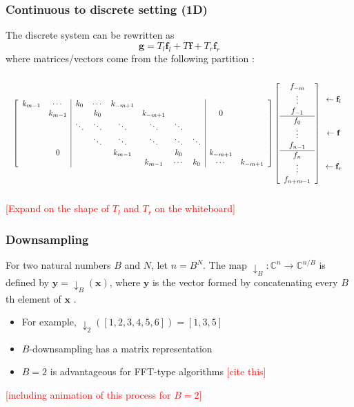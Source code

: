 \documentclass{beamer}
\newcommand{\ToDo}[1]{\textcolor{red}{[#1]}}
\newcommand{\gVec}{\mathbf{g}}	%
\newcommand{\fVec}{\mathbf{f}}	%
\begin{document}
\begin{frame}
\frametitle{Continuous to discrete setting (1D)}
The discrete system can be rewritten as
\[\gVec = T_{l}\fVec_{l} + T\fVec + T_{r}\fVec_{r}\]
where matrices/vectors come from the following partition \cite{NeumannDCT}:
\[\resizebox{1 \textwidth}{!}{$
\left[\begin{array}{cc|cccccc|cc}
k_{m-1} & \cdots & k_0 & \cdots & k_{-m+1} & & & & & \\
 & k_{m-1} & & k_0 & & k_{-m+1} & & & 0 & \\
 & & \ddots & \ddots & \ddots & \ddots & \ddots & & & \\
 & & & \ddots & \ddots & \ddots & \ddots & \ddots & & \\
 & 0 & & & k_{m-1} & & k_0 & & k_{-m+1} & \\
 & & & & & k_{m-1} & \cdots & k_0 & \cdots & k_{-m+1} 
\end{array}\right]\left[\begin{array}{c}
f_{-m} \\
\vdots \\
f_{-1} \\
\hline 
f_0 \\
\vdots \\
f_{n-1} \\
\hline
f_n \\
\vdots \\
f_{n+m-1}
\end{array}\right]\begin{array}{c}
\vspace*{0.25 in} \\
\leftarrow \fVec_l \\
\vspace*{0.25 in} \\
\leftarrow \fVec \\
\vspace*{0.25 in} \\
\leftarrow \fVec_r \\
\vspace*{0.25 in} 
\end{array}$}\]
\ToDo{Expand on the shape of $T_l$ and $T_r$ on the whiteboard}
\end{frame}

\begin{frame}
\frametitle{Downsampling}
For two natural numbers $B$ and $N$, let $n = B^N$. The map $\downarrow_B:\mathbb{C}^n \rightarrow \mathbb{C}^{n/B}$ is defined by $\mathbf{y} = \downarrow_B(\mathbf{x})$, where $\mathbf{y}$ is the vector formed by concatenating every $B$th element of $\mathbf{x}$ \cite{AudioDFT}.
\begin{itemize}
\item For example, $\downarrow_2([1,2,3,4,5,6]) = [1,3,5]$
\item $B$-downsampling has a matrix representation
\item $B = 2$ is advantageous for FFT-type algorithms \ToDo{cite this}
\end{itemize}
\ToDo{including animation of this process for $B = 2$}
\end{frame}
\end{document}
